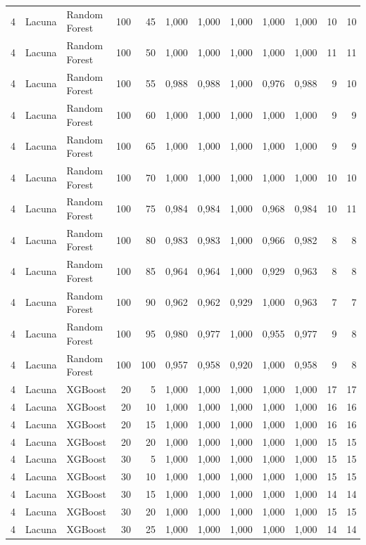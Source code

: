 \begin{longtable}{@{}rllrrrrrrrrr@{}}
4 & Lacuna & Random Forest & 100 & 45 & 1,000 & 1,000 & 1,000 & 1,000 & 1,000 & 10 & 10 \\
4 & Lacuna & Random Forest & 100 & 50 & 1,000 & 1,000 & 1,000 & 1,000 & 1,000 & 11 & 11 \\
4 & Lacuna & Random Forest & 100 & 55 & 0,988 & 0,988 & 1,000 & 0,976 & 0,988 & 9 & 10 \\
4 & Lacuna & Random Forest & 100 & 60 & 1,000 & 1,000 & 1,000 & 1,000 & 1,000 & 9 & 9 \\
4 & Lacuna & Random Forest & 100 & 65 & 1,000 & 1,000 & 1,000 & 1,000 & 1,000 & 9 & 9 \\
4 & Lacuna & Random Forest & 100 & 70 & 1,000 & 1,000 & 1,000 & 1,000 & 1,000 & 10 & 10 \\
4 & Lacuna & Random Forest & 100 & 75 & 0,984 & 0,984 & 1,000 & 0,968 & 0,984 & 10 & 11 \\
4 & Lacuna & Random Forest & 100 & 80 & 0,983 & 0,983 & 1,000 & 0,966 & 0,982 & 8 & 8 \\
4 & Lacuna & Random Forest & 100 & 85 & 0,964 & 0,964 & 1,000 & 0,929 & 0,963 & 8 & 8 \\
4 & Lacuna & Random Forest & 100 & 90 & 0,962 & 0,962 & 0,929 & 1,000 & 0,963 & 7 & 7 \\
4 & Lacuna & Random Forest & 100 & 95 & 0,980 & 0,977 & 1,000 & 0,955 & 0,977 & 9 & 8 \\
4 & Lacuna & Random Forest & 100 & 100 & 0,957 & 0,958 & 0,920 & 1,000 & 0,958 & 9 & 8 \\
4 & Lacuna & XGBoost & 20 & 5 & 1,000 & 1,000 & 1,000 & 1,000 & 1,000 & 17 & 17 \\
4 & Lacuna & XGBoost & 20 & 10 & 1,000 & 1,000 & 1,000 & 1,000 & 1,000 & 16 & 16 \\
4 & Lacuna & XGBoost & 20 & 15 & 1,000 & 1,000 & 1,000 & 1,000 & 1,000 & 16 & 16 \\
4 & Lacuna & XGBoost & 20 & 20 & 1,000 & 1,000 & 1,000 & 1,000 & 1,000 & 15 & 15 \\
4 & Lacuna & XGBoost & 30 & 5 & 1,000 & 1,000 & 1,000 & 1,000 & 1,000 & 15 & 15 \\
4 & Lacuna & XGBoost & 30 & 10 & 1,000 & 1,000 & 1,000 & 1,000 & 1,000 & 15 & 15 \\
4 & Lacuna & XGBoost & 30 & 15 & 1,000 & 1,000 & 1,000 & 1,000 & 1,000 & 14 & 14 \\
4 & Lacuna & XGBoost & 30 & 20 & 1,000 & 1,000 & 1,000 & 1,000 & 1,000 & 15 & 15 \\
4 & Lacuna & XGBoost & 30 & 25 & 1,000 & 1,000 & 1,000 & 1,000 & 1,000 & 14 & 14 \\

\end{longtable}
